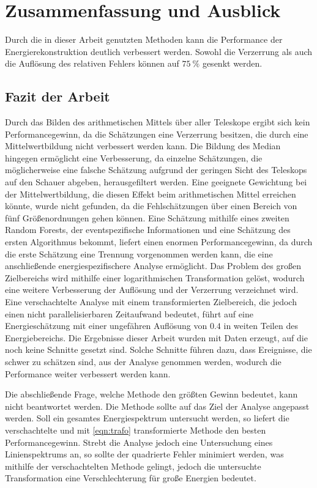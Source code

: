\chapter{Zusammenfassung und Ausblick}
Durch die in dieser Arbeit genutzten Methoden kann die Performance der Energierekonstruktion deutlich verbessert werden.
Sowohl die Verzerrung als auch die Auflösung des relativen Fehlers können auf $\SI{75}{\percent}$ gesenkt werden.

\section{Fazit der Arbeit}

Durch das Bilden des arithmetischen Mittels über aller Teleskope ergibt sich kein Performancegewinn, da die Schätzungen
eine Verzerrung besitzen, die durch eine Mittelwertbildung nicht verbessert werden kann.
Die Bildung des Median hingegen ermöglicht eine Verbesserung, da einzelne Schätzungen, die möglicherweise
eine falsche Schätzung aufgrund der geringen Sicht des Teleskops auf den Schauer abgeben, herausgefiltert werden.
Eine geeignete Gewichtung bei der Mittelwertbildung, die diesen Effekt beim arithmetischen Mittel erreichen könnte, wurde
nicht gefunden, da die Fehlschätzungen über einen Bereich von fünf Größenordnungen gehen können.
Eine Schätzung mithilfe eines zweiten Random Forests, der eventspezifische Informationen und eine
Schätzung des ersten Algorithmus bekommt, liefert einen enormen Performancegewinn, da durch die erste Schätzung eine
Trennung vorgenommen werden kann, die eine anschließende energiespezifischere Analyse ermöglicht.
Das Problem des großen Zielbereichs wird mithilfe einer logarithmischen Transformation gelöst, wodurch eine weitere
Verbesserung der Auflösung und der Verzerrung verzeichnet wird.
Eine verschachtelte Analyse mit einem transformierten Zielbereich, die jedoch einen nicht parallelisierbaren Zeitaufwand bedeutet,
führt auf eine Energieschätzung mit einer ungefähren Auflösung von $0.4$ in weiten Teilen des
Energiebereichs. Die Ergebnisse dieser Arbeit wurden mit Daten erzeugt, auf die noch keine Schnitte gesetzt sind. Solche
Schnitte führen dazu, dass Ereignisse, die schwer zu schätzen sind, aus der Analyse genommen werden, wodurch die Performance
weiter verbessert werden kann.

Die abschließende Frage, welche Methode den größten Gewinn bedeutet, kann nicht beantwortet werden.
Die Methode sollte auf das Ziel der Analyse angepasst werden.
Soll ein gesamtes Energiespektrum untersucht werden, so liefert die verschachtelte und mit \eqref{eqn:trafo} transformierte Methode
den besten Performancegewinn.
Strebt die Analyse jedoch eine Untersuchung eines Linienspektrums an, so sollte der quadrierte Fehler minimiert werden, was mithilfe
der verschachtelten Methode gelingt, jedoch die untersuchte Transformation eine Verschlechterung für große Energien bedeutet.

